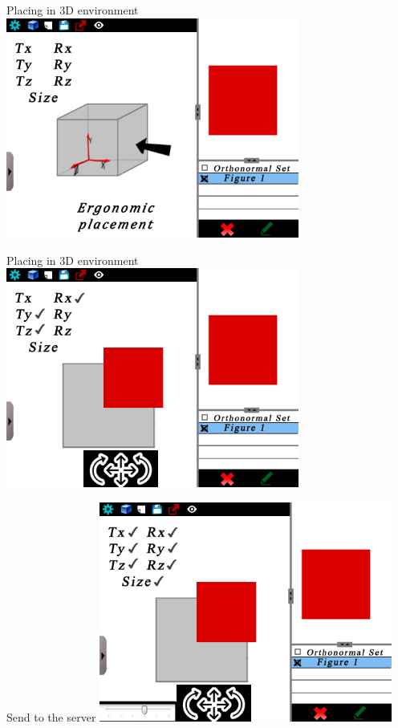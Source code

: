 \documentclass[a4paper,10pt]{beamer}
\begin{document}
			\begin{frame}{Placing in 3D environment}
				\includegraphics[height=205pt]{maquette/maquette_5.png}
			\end{frame}
			
			\begin{frame}{Placing in 3D environment}
				\includegraphics[height=205pt]{maquette/maquette_6.png}
			\end{frame}
			
			\begin{frame}{Send to the server}
				\includegraphics[height=205pt]{maquette/maquette_7.png}
			\end{frame}
			
\end{document}
